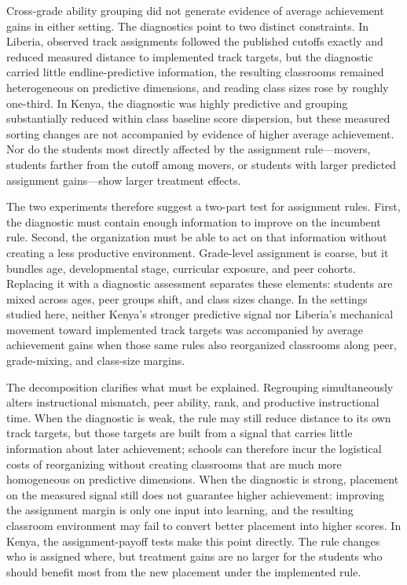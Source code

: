 \documentclass[11pt]{article}
\begin{document}
Cross-grade ability grouping did not generate evidence of average achievement gains in either setting. The diagnostics point to two distinct constraints. In Liberia, observed track assignments followed the published cutoffs exactly and reduced measured distance to implemented track targets, but the diagnostic carried little endline-predictive information, the resulting classrooms remained heterogeneous on predictive dimensions, and reading class sizes rose by roughly one-third. In Kenya, the diagnostic was highly predictive and grouping substantially reduced within class baseline score dispersion, but these measured sorting changes are not accompanied by evidence of higher average achievement. Nor do the students most directly affected by the assignment rule---movers, students farther from the cutoff among movers, or students with larger predicted assignment gains---show larger treatment effects.

The two experiments therefore suggest a two-part test for assignment rules. First, the diagnostic must contain enough information to improve on the incumbent rule. Second, the organization must be able to act on that information without creating a less productive environment. Grade-level assignment is coarse, but it bundles age, developmental stage, curricular exposure, and peer cohorts. Replacing it with a diagnostic assessment separates these elements: students are mixed across ages, peer groups shift, and class sizes change. In the settings studied here, neither Kenya's stronger predictive signal nor Liberia's mechanical movement toward implemented track targets was accompanied by average achievement gains when those same rules also reorganized classrooms along peer, grade-mixing, and class-size margins.

The decomposition clarifies what must be explained. Regrouping simultaneously alters instructional mismatch, peer ability, rank, and productive instructional time. When the diagnostic is weak, the rule may still reduce distance to its own track targets, but those targets are built from a signal that carries little information about later achievement; schools can therefore incur the logistical costs of reorganizing without creating classrooms that are much more homogeneous on predictive dimensions. When the diagnostic is strong, placement on the measured signal still does not guarantee higher achievement: improving the assignment margin is only one input into learning, and the resulting classroom environment may fail to convert better placement into higher scores. In Kenya, the assignment-payoff tests make this point directly. The rule changes who is assigned where, but treatment gains are no larger for the students who should benefit most from the new placement under the implemented rule.
\end{document}

